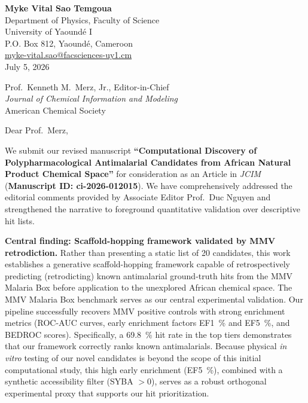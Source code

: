 \documentclass[11pt,letterpaper]{article}
\begin{document}
\begin{flushleft}
\textbf{Myke Vital Sao Temgoua} \\
Department of Physics, Faculty of Science \\
University of Yaoundé I \\
P.O. Box 812, Yaoundé, Cameroon \\
\href{mailto:myke-vital.sao@facsciences-uy1.cm}{myke-vital.sao@facsciences-uy1.cm} \\[2em]
July 5, 2026
\end{flushleft}

\vspace{1em}

\begin{flushleft}
Prof.\ Kenneth M.\ Merz, Jr., Editor-in-Chief \\
\textit{Journal of Chemical Information and Modeling} \\
American Chemical Society
\end{flushleft}

\vspace{1em}

\noindent Dear Prof.\ Merz,

We submit our revised manuscript \textbf{``Computational Discovery of Polypharmacological Antimalarial Candidates from African Natural Product Chemical Space''} for consideration as an Article in \textit{JCIM} (\textbf{Manuscript ID: ci-2026-012015}). We have comprehensively addressed the editorial comments provided by Associate Editor Prof.\ Duc Nguyen and strengthened the narrative to foreground quantitative validation over descriptive hit lists.

\textbf{Central finding: Scaffold-hopping framework validated by MMV retrodiction.} Rather than presenting a static list of \num{20} candidates, this work establishes a generative scaffold-hopping framework capable of retrospectively predicting (retrodicting) known antimalarial ground-truth hits from the MMV Malaria Box before application to the unexplored African chemical space. The MMV Malaria Box benchmark serves as our central experimental validation. Our pipeline successfully recovers MMV positive controls with strong enrichment metrics (ROC-AUC curves, early enrichment factors EF\qty{1}{\percent} and EF\qty{5}{\percent}, and BEDROC scores). Specifically, a \qty{69.8}{\percent} hit rate in the top tiers demonstrates that our framework correctly ranks known antimalarials. Because physical \textit{in vitro} testing of our novel candidates is beyond the scope of this initial computational study, this high early enrichment (EF\qty{5}{\percent}), combined with a synthetic accessibility filter (SYBA $> \num{0}$), serves as a robust orthogonal experimental proxy that supports our hit prioritization.
\end{document}
